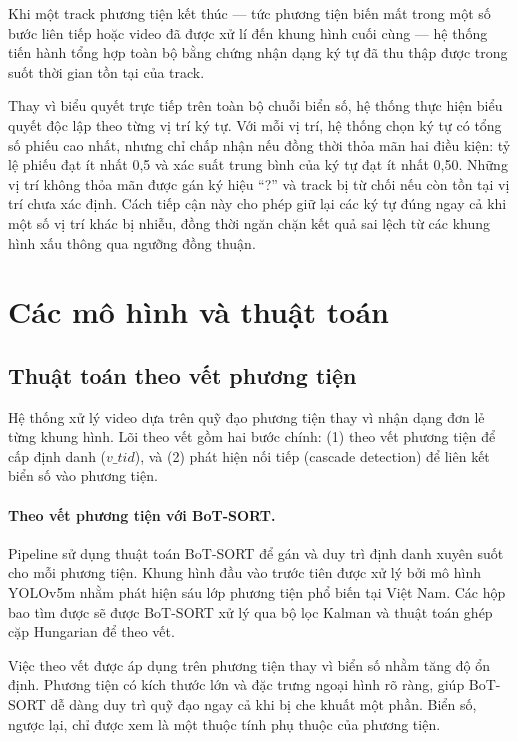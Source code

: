 \documentclass[../DoAn.tex]{subfiles}
\begin{document}
Khi một track phương tiện kết thúc — tức phương tiện biến mất trong một số bước liên tiếp hoặc video đã được xử lí đến khung hình cuối cùng — hệ thống tiến hành tổng hợp toàn bộ bằng chứng nhận dạng ký tự đã thu thập được trong suốt thời gian tồn tại của track.

Thay vì biểu quyết trực tiếp trên toàn bộ chuỗi biển số, hệ thống thực hiện biểu quyết độc lập theo từng vị trí ký tự. Với mỗi vị trí, hệ thống chọn ký tự có tổng số phiếu cao nhất, nhưng chỉ chấp nhận nếu đồng thời thỏa mãn hai điều kiện: tỷ lệ phiếu đạt ít nhất 0,5 và xác suất trung bình của ký tự đạt ít nhất 0,50. Những vị trí không thỏa mãn được gán ký hiệu ``?'' và track bị từ chối nếu còn tồn tại vị trí chưa xác định. Cách tiếp cận này cho phép giữ lại các ký tự đúng ngay cả khi một số vị trí khác bị nhiễu, đồng thời ngăn chặn kết quả sai lệch từ các khung hình xấu thông qua ngưỡng đồng thuận.

\section{Các mô hình và thuật toán}
\label{section:3.3}

\subsection{Thuật toán theo vết phương tiện}
\label{subsection:3.3.tracking}

Hệ thống xử lý video dựa trên quỹ đạo phương tiện thay vì nhận dạng đơn lẻ từng khung hình. Lõi theo vết gồm hai bước chính: (1) theo vết phương tiện để cấp định danh ($v\_tid$), và (2) phát hiện nối tiếp (cascade detection) để liên kết biển số vào phương tiện.

\paragraph{Theo vết phương tiện với BoT-SORT.}
Pipeline sử dụng thuật toán BoT-SORT \cite{aharon2022bot} để gán và duy trì định danh xuyên suốt cho mỗi phương tiện. Khung hình đầu vào trước tiên được xử lý bởi mô hình YOLOv5m nhằm phát hiện sáu lớp phương tiện phổ biến tại Việt Nam. Các hộp bao tìm được sẽ được BoT-SORT xử lý qua bộ lọc Kalman và thuật toán ghép cặp Hungarian để theo vết. 

Việc theo vết được áp dụng trên phương tiện thay vì biển số nhằm tăng độ ổn định. Phương tiện có kích thước lớn và đặc trưng ngoại hình rõ ràng, giúp BoT-SORT dễ dàng duy trì quỹ đạo ngay cả khi bị che khuất một phần. Biển số, ngược lại, chỉ được xem là một thuộc tính phụ thuộc của phương tiện.
\end{document}
